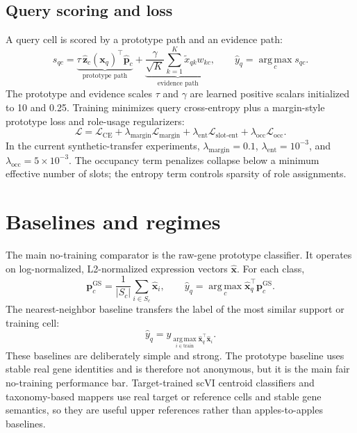 \documentclass{article}
\newcommand{\argmax}{\operatorname*{arg\,max}}
\begin{document}
\subsection{Query scoring and loss}

A query cell is scored by a prototype path and an evidence path:
\begin{equation}
    s_{qc}=\underbrace{\tau\,\hat{\mathbf{z}}_c(\mathbf{x}_q)^\top\hat{\mathbf{p}}_c}_{\text{prototype path}}
    +
    \underbrace{\frac{\gamma}{\sqrt{K}}\sum_{k=1}^{K}\tilde{x}_{qk}w_{kc}}_{\text{evidence path}},
    \qquad
    \hat y_q=\argmax_c s_{qc}.
\end{equation}
The prototype and evidence scales \(\tau\) and \(\gamma\) are learned positive scalars initialized to 10 and 0.25. Training minimizes query cross-entropy plus a margin-style prototype loss and role-usage regularizers:
\begin{equation}
    \mathcal{L}=\mathcal{L}_{\mathrm{CE}}+
    \lambda_{\mathrm{margin}}\mathcal{L}_{\mathrm{margin}}+
    \lambda_{\mathrm{ent}}\mathcal{L}_{\mathrm{slot\text{-}ent}}+
    \lambda_{\mathrm{occ}}\mathcal{L}_{\mathrm{occ}}.
\end{equation}
In the current synthetic-transfer experiments, \(\lambda_{\mathrm{margin}}=0.1\), \(\lambda_{\mathrm{ent}}=10^{-3}\), and \(\lambda_{\mathrm{occ}}=5\times10^{-3}\). The occupancy term penalizes collapse below a minimum effective number of slots; the entropy term controls sparsity of role assignments.

\section{Baselines and regimes}

The main no-training comparator is the raw-gene prototype classifier. It operates on log-normalized, L2-normalized expression vectors \(\hat{\mathbf{x}}\). For each class,
\begin{equation}
    \mathbf{p}^{\mathrm{GS}}_c=\frac{1}{|S_c|}\sum_{i\in S_c}\hat{\mathbf{x}}_i,
    \qquad
    \hat y_q=\argmax_c \hat{\mathbf{x}}_q^\top\mathbf{p}^{\mathrm{GS}}_c.
\end{equation}
The nearest-neighbor baseline transfers the label of the most similar support or training cell:
\begin{equation}
    \hat y_q=y_{\argmax_{i\in\mathrm{train}}\hat{\mathbf{x}}_q^\top\hat{\mathbf{x}}_i}.
\end{equation}
These baselines are deliberately simple and strong. The prototype baseline uses stable real gene identities and is therefore not anonymous, but it is the main fair no-training performance bar. Target-trained scVI centroid classifiers and taxonomy-based mappers use real target or reference cells and stable gene semantics, so they are useful upper references rather than apples-to-apples baselines.
\end{document}

